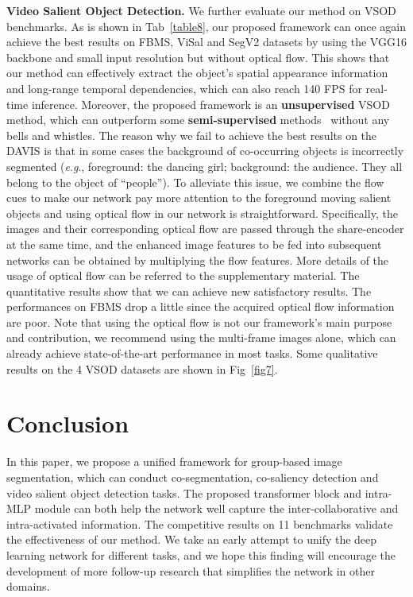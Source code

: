 \documentclass[journal]{IEEEtran}
\newcommand{\eg}{\textit{e}.\textit{g}., }
\begin{document}
\vspace{1ex}



\noindent \textbf{Video Salient Object Detection.} We further evaluate our method on VSOD benchmarks. As is shown in Tab~\ref{table8}, our proposed framework can once again achieve the best results on FBMS, ViSal and SegV2 datasets by using the VGG16 backbone and small input resolution but without optical flow.
This shows that our method can effectively extract the object's spatial appearance information and long-range temporal dependencies, which can also reach 140 FPS for real-time inference.
Moreover, the proposed framework is an \textbf{unsupervised} VSOD method, which can outperform some \textbf{semi-supervised} methods~\cite{park2021learning,mei2021transvos,yan2019semi} without any bells and whistles.
The reason why we fail to achieve the best results on the DAVIS is that in some cases the background of co-occurring objects is incorrectly segmented (\eg foreground: the dancing girl; background: the audience. They all belong to the object of “people”). 
To alleviate this issue, we combine the flow cues to make our network pay more attention to the foreground moving salient objects and using optical flow in our network is straightforward.
Specifically, the images and their corresponding optical flow are passed through the share-encoder at the same time, and the enhanced image features to be fed into subsequent networks can be obtained by multiplying the flow features.
More details of the usage of optical flow can be referred to the supplementary material.
The quantitative results show that we can achieve new satisfactory results. The performances on FBMS drop a little since the acquired optical flow information are poor.
Note that using the optical flow is not our framework's main purpose and contribution, we recommend using the multi-frame images alone, which can already achieve state-of-the-art performance in most tasks.
Some qualitative results on the 4 VSOD datasets are shown in Fig~\ref{fig7}.








\section{Conclusion}
In this paper, we propose a unified framework for group-based image segmentation, which can conduct co-segmentation, co-saliency detection and video salient object detection tasks. The proposed transformer block and intra-MLP module can both help the network well capture the inter-collaborative and intra-activated information. The competitive results on 11 benchmarks validate the effectiveness of our method.
We take an early attempt to unify the deep learning network for different tasks, and we hope this finding will encourage the development of more follow-up research that simplifies the network in other domains.
\end{document}
